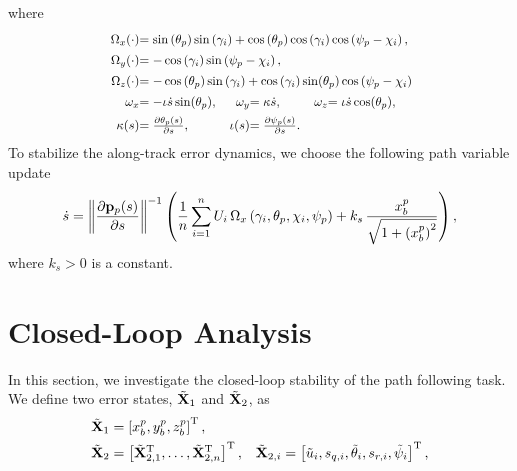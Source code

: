 where
\begin{subequations}
    \begin{align}
        \scale[0.90]{\Omega_x(\cdot)} & \mathrlap{\scale[0.90]{= \sin\left(\theta_p\right)\sin\left(\gamma_i\right) + \cos\left(\theta_p\right)\cos\left(\gamma_i\right)\cos\left(\psi_p-\chi_i\right),}} \\
        \scale[0.90]{\Omega_y(\cdot)} & \mathrlap{\scale[0.90]{= -\cos\left(\gamma_i\right)\sin\left(\psi_p - \chi_i\right),}} \\
        \scale[0.90]{\Omega_z(\cdot)} & \mathrlap{\scale[0.90]{=-\cos\left(\theta_p\right)\sin\left(\gamma_i\right) + \cos\left(\gamma_i\right)\sin(\theta_p)\cos\left(\psi_p-\chi_i\right)}} \\
        \scale[0.90]{\omega_x} & \scale[0.90]{= -\iota\dot{s}\sin(\theta_p),} &
        \scale[0.90]{\omega_y} & \scale[0.90]{= \kappa\dot{s},} &
        \scale[0.90]{\omega_z} & \scale[0.90]{= \iota\dot{s}\cos(\theta_p),} \\
        \scale[0.90]{\kappa(s)} & \scale[0.90]{= \frac{\partial \theta_p(s)}{\partial s},} &
        \scale[0.90]{\iota(s)} & \scale[0.90]{= \frac{\partial \psi_p(s)}{\partial s}.}
    \end{align}
\end{subequations}
To stabilize the along-track error dynamics, we choose the following path variable update 
\begin{equation}
    \dot{s} = \left\|\frac{\partial \mathbf{p}_p(s)}{\partial s}\right\|^{-1} \left( \frac{1}{n}\sum_{i=1}^n U_i\,\Omega_x\left(\gamma_i, \theta_p, \chi_i, \psi_p\right) + k_{s}\,\frac{x_b^p}{\sqrt{1+\left(x_b^p\right)^2}}\right),
    \label{eq:nsb_5dof_path_update}
\end{equation}
where $k_{s} > 0$ is a constant.

\section{Closed-Loop Analysis}
\label{sec:nsb_5dof_path_stability}
In this section, we investigate the closed-loop stability of the path following task.
We define two error states, $\tilde{\mathbf{X}}_1$ and $\tilde{\mathbf{X}}_2$, as
\begin{align}
    \tilde{\mathbf{X}}_1 &= \left[x_b^p, y_b^p, z_b^p\right]^{\mathrm{T}}, && \\
    \tilde{\mathbf{X}}_2 &= \left[\tilde{\mathbf{X}}_{2,1}^{\mathrm{T}}, \ldots, \tilde{\mathbf{X}}_{2,n}^{\mathrm{T}}\right]^{\mathrm{T}}, &
    \tilde{\mathbf{X}}_{2,i} &= \left[\tilde{u}_i, s_{q,i}, \tilde{\theta}_i, s_{r,i}, \tilde{\psi}_i\right]^{\mathrm{T}},
\end{align}

